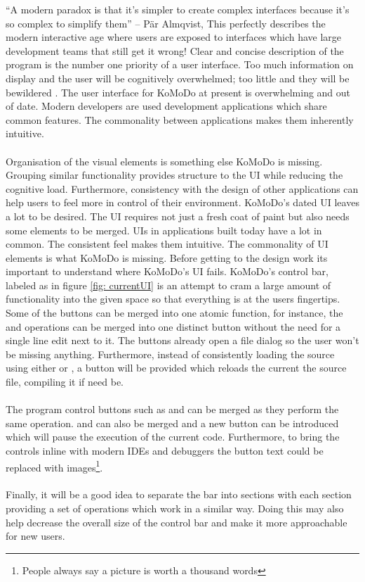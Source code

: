\graphicspath{ {images/design/} }
``A modern paradox is that it's simpler to create complex interfaces because it's so complex to simplify them'' – P{\"a}r Almqvist, This perfectly describes the modern interactive age where users are exposed to interfaces which have large development teams that still get it wrong! Clear and concise description of the program is the number one priority of a user interface. Too much information on display and the user will be cognitively overwhelmed; too little and they will be bewildered \cite{design_principles}. The user interface for KoMoDo at present is overwhelming and out of date. Modern developers are used development applications which share common features. The commonality between applications makes them inherently intuitive.\\\\
%
Organisation of the visual elements is something else KoMoDo is missing. Grouping similar functionality provides structure to the UI while reducing the cognitive load. Furthermore, consistency with the design of other applications can help users to feel more in control of their environment\cite{design_principles_two}.
KoMoDo's dated UI leaves a lot to be desired. The UI requires not just a fresh coat of paint but also needs some elements to be merged. UIs in applications built today have a lot in common. The consistent feel makes them intuitive. The commonality of UI elements is what KoMoDo is missing. Before getting to the design work its important to understand where KoMoDo's UI fails.
%
KoMoDo's control bar, labeled as  in figure \ref{fig: currentUI} is an attempt to cram a large amount of functionality into the given space so that everything is at the users fingertips. Some of the buttons can be merged into one atomic function, for instance, the  and  operations can be merged into one distinct button without the need for a single line edit next to it. The buttons already open a file dialog so the user won't be missing anything. Furthermore, instead of consistently loading the source using either  or , a  button will be provided which reloads the current the source file, compiling it if need be.\\\\
%
The program control buttons such as  and  can be merged as they perform the same operation.  and  can also be merged and a new button  can be introduced which will pause the execution of the current code. Furthermore, to bring the controls inline with modern IDEs and debuggers the button text could be replaced with images\footnote{People always say a picture is worth a thousand words}.\\\\
%
Finally, it will be a good idea to separate the bar into sections with each section providing a set of operations which work in a similar way. Doing this may also help decrease the overall size of the control bar and make it more approachable for new users.

